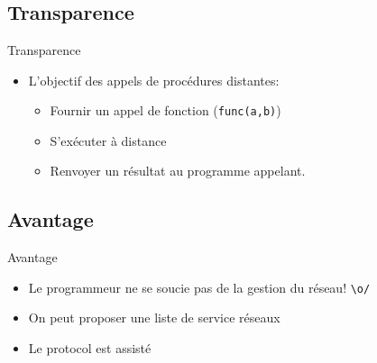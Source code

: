 \section{\sectitle}
\begin{frame}[containsverbatim]{\sectitle}
    \def\subsectitle{Transparence}
    \subsection{\subsectitle}
    \begin{block}{\subsectitle}
        \begin{itemize}
            \item L'objectif des appels de procédures distantes:
                \begin{itemize}
                    \item Fournir un appel de fonction (\verb+func(a,b)+)
                    \item S'exécuter à distance
                    \item Renvoyer un résultat au programme appelant.
                \end{itemize}
        \end{itemize}
    \end{block}
    \def\subsectitle{Avantage}
    \subsection{\subsectitle}
    \begin{block}{\subsectitle}
        \begin{itemize}
            \item Le programmeur ne se soucie pas de la gestion du réseau!
                \verb+\o/+
            \item On peut proposer une liste de service réseaux
            \item Le protocol est assisté
        \end{itemize}
    \end{block}
\end{frame}


\def\sectitle{Définir le protocol}
